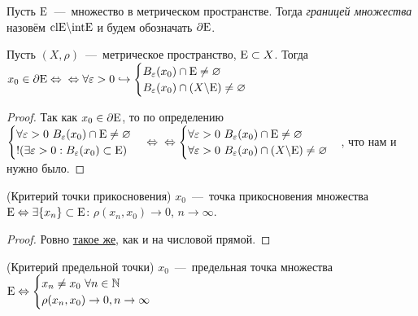 \begin{definition}
    Пусть $\text{E}$~---~множество в метрическом пространстве. Тогда \textit{границей множества} назовём $\text{cl}\text{E} \backslash \text{int}\text{E}$ и будем обозначать $\partial \text{E}$.
\end{definition}
\begin{lemma}
    Пусть $(X, \rho)$~---~метрическое пространство, $\text{E} \subset X$. Тогда $x_{0} \in \partial \E \Leftrightarrow \newline \Leftrightarrow \forall \epsilon > 0 \hookrightarrow
    \begin{cases}
        B_{\epsilon} (x_{0}) \cap \E \neq \varnothing \\
        B_{\epsilon} (x_{0}) \cap (X \backslash \E) \neq \varnothing
    \end{cases}$
\end{lemma}
\begin{proof}
    Так как $x_{0} \in \partial \text{E}$, то по определению $\begin{cases}
        \forall \epsilon > 0 \ B_{\epsilon} (x_0) \cap \E \neq \varnothing \\
        !(\exists \epsilon > 0: B_{\epsilon} (x_{0}) \subset \E)
    \end{cases} \Leftrightarrow \newline \Leftrightarrow \begin{cases}
        \forall \epsilon > 0 \ B_{\epsilon} (x_0) \cap \E \neq \varnothing \\
        \forall \epsilon > 0 \ B_{\epsilon} (x_0) \cap (X \backslash \E) \neq \varnothing
    \end{cases}$, что нам и нужно было.
\end{proof}
\begin{theorem}
    (Критерий точки прикосновения) $x_{0}$~---~точка прикосновения множества $\text{E} \Leftrightarrow \exists \{ x_{n}\} \subset \text{E}$: $\rho(x_{n}, x_{0})\to 0$, $n\to \infty$.
\end{theorem}
\begin{proof}
    Ровно \hyperlink{thm3.1}{такое же}, как и на числовой прямой.
\end{proof}
\begin{theorem}
    (Критерий предельной точки) $x_{0}$~---~предельная точка множества $\text{E} \Leftrightarrow 
    \begin{cases}
        x_{n} \neq x_{0} \ \forall n \in \mathbb{N} \\
        \rho(x_{n}, x_{0})\to 0, n\to \infty
    \end{cases}$
\end{theorem}
